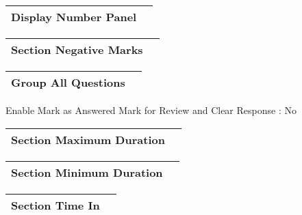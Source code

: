 \documentclass{article}
\begin{document}
\begin{longtable}{|c|c|}
\hline
\textbf{Display Number Panel} & \textbf{} \\ \hline
\end{longtable}

\begin{longtable}{|c|c|}
\hline
\textbf{Section Negative Marks} & \textbf{} \\ \hline
\end{longtable}

\begin{longtable}{|c|c|}
\hline
\textbf{Group All Questions} & \textbf{} \\ \hline
\end{longtable}

Enable Mark as Answered Mark for Review and 
Clear Response :
No\\

\begin{longtable}{|c|c|}
\hline
\textbf{Section Maximum Duration} & \textbf{} \\ \hline
\end{longtable}

\begin{longtable}{|c|c|}
\hline
\textbf{Section Minimum Duration} & \textbf{} \\ \hline
\end{longtable}

\begin{longtable}{|c|c|}
\hline
\textbf{Section Time In} & \textbf{} \\ \hline
\end{longtable}
\end{document}
